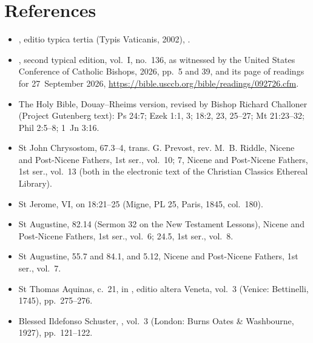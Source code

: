 \section*{References}

{\small
\begin{itemize}\setlength{\itemsep}{0.15em}\setlength{\parskip}{0pt}
\item {}, editio typica tertia (Typis Vaticanis, 2002), .
\item {}, second typical edition, vol.~I, no.~136, as witnessed by the United States Conference of Catholic Bishops,  2026, pp.~5 and 39, and its page of readings for 27~September 2026, \url{https://bible.usccb.org/bible/readings/092726.cfm}.
\item The Holy Bible, Douay--Rheims version, revised by Bishop Richard Challoner (Project Gutenberg text): Ps 24:7; Ezek 1:1, 3; 18:2, 23, 25--27; Mt 21:23--32; Phil 2:5--8; 1~Jn 3:16.
\item St John Chrysostom,  67.3--4, trans. G. Prevost, rev. M.~B. Riddle, Nicene and Post-Nicene Fathers, 1st ser., vol.~10;  7, Nicene and Post-Nicene Fathers, 1st ser., vol.~13 (both in the electronic text of the Christian Classics Ethereal Library).
\item St Jerome,  VI, on 18:21--25 (Migne, PL 25, Paris, 1845, col.~180).
\item St Augustine,  82.14 (Sermon 32 on the New Testament Lessons), Nicene and Post-Nicene Fathers, 1st ser., vol.~6;  24.5, 1st ser., vol.~8.
\item St Augustine,  55.7 and 84.1, and  5.12, Nicene and Post-Nicene Fathers, 1st ser., vol.~7.
\item St Thomas Aquinas,  c.~21, in , editio altera Veneta, vol.~3 (Venice: Bettinelli, 1745), pp.~275--276.
\item Blessed Ildefonso Schuster, , vol.~3 (London: Burns Oates \& Washbourne, 1927), pp.~121--122.
\end{itemize}
\par}
